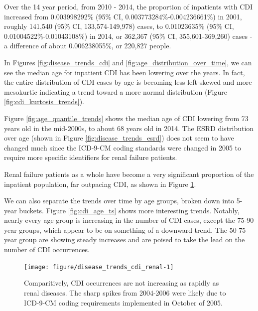 \documentclass[12pt]{ociamthesis}\usepackage[]{graphicx}\usepackage[]{color}
\newenvironment{knitrout}{}{} %
\newcommand{\ci}[3]{#1 (95\% CI, #2-#3)}
\newcommand{\cip}[3]{#1\% (95\% CI, #2\%-#3\%)}
\begin{document}
Over the 14 year period, from 2010 - 2014, the proportion of inpatients with CDI increased from 
\cip{0.003998292}{0.003773284}{0.004236661} in 2001, roughly 
\ci{141,540}{133,574}{149,978} cases, to
\cip{0.01023635}{0.01004522}{0.01043108} in 2014, or
\ci{362,367}{355,601}{369,260} cases - 
a difference of about 0.006238055\%, or 220,827 people. 

In Figures \ref{fig:disease_trends_cdi} and \ref{fig:age_distribution_over_time}, we can see the median age for inpatient CDI has been lowering over the years.
In fact, the entire distribution of CDI cases by age is becoming less left-skewed and more mesokurtic indicating a trend toward a more normal distribution 
(Figure \ref{fig:cdi_kurtosis_trends}). 

Figure \ref{fig:age_quantile_trends} shows the median age of CDI lowering from 73 years old in the mid-2000s, to about 68 years old in 2014. The ESRD distribution
over age (shown in Figure \ref{fig:disease_trends_esrd}) does not seem to have changed much since the ICD-9-CM 
coding standards were changed in 2005 to require more specific identifiers for renal failure patients.

Renal failure patients as a whole have become a very significant proportion of the inpatient population, far outpacing CDI, as shown in Figure \ref{fig:disease_trends_cdi_renal}.


We can also separate the trends over time by age groups, broken down into 5-year buckets. Figure \ref{fig:cdi_age_ts} shows more interesting trends.
Notably, nearly every age group is increasing in the number of CDI cases, except the 75-90 year groups, which appear to be on something of a downward trend.
The 50-75 year group are showing steady increases and are poised to take the lead on the number of CDI occurrences. 


\begin{knitrout}
\color{fgcolor}\begin{figure}

{\centering \texttt{[image: figure/disease\_trends\_cdi\_renal-1]} 

}

\caption[Comparitively, CDI occurrences are not increasing as rapidly as renal diseases]{Comparitively, CDI occurrences are not increasing as rapidly as renal diseases. The sharp spikes from 2004-2006 were likely due to ICD-9-CM coding requirements implemented in October of 2005.}\label{fig:disease_trends_cdi_renal}
\end{figure}


\end{knitrout}
\label{fig:disease_trends_cdi_renal}
\end{document}
